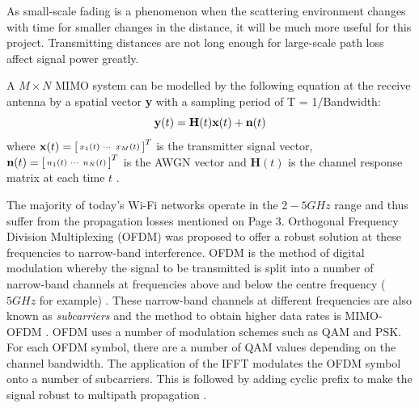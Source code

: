 As small-scale fading is a phenomenon when the scattering environment changes with time for smaller changes in the distance, it will be much more useful for this project. Transmitting distances are not long enough for large-scale path loss affect signal power greatly. \par
A $M\times N$ MIMO system can be modelled by the following equation at the receive antenna by a spatial vector \textbf{y} with a sampling period of T = 1/Bandwidth:
\vspace{-11pt}
\begin{equation}\label{eqn:2.1}
    \textbf{y}(t) = \textbf{H}(t)\textbf{x}(t)+\textbf{n}(t)
    \vspace{-11pt}
\end{equation}
where  $\textbf{x}(t) = \begin{bsmallmatrix}x_1(t) & \cdots & x_M(t)\end{bsmallmatrix}^T$ is the transmitter signal vector, $\textbf{n}(t) = \begin{bsmallmatrix}n_1(t) & \cdots & n_N(t)\end{bsmallmatrix}^T$ is the AWGN vector and $\textbf{H}(t)$ is the channel response matrix at each time $t$ \citep{channelEquations}. \par
The majority of today's Wi-Fi networks operate in the $2-5GHz$ range and thus suffer from the propagation losses mentioned on Page 3. Orthogonal Frequency Division Multiplexing (OFDM) was proposed to offer a robust solution at these frequencies to narrow-band interference. OFDM is the method of digital modulation whereby the signal to be transmitted is split into a number of narrow-band channels at frequencies above and below the centre frequency ($5GHz$ for example) \citep{OFDM}. 
These narrow-band channels at different frequencies are also known as \textit{subcarriers} and the method to obtain higher data rates is MIMO-OFDM \citep{802.11nStandard}. OFDM uses a number of modulation schemes such as QAM and PSK. For each OFDM symbol, there are a number of QAM values depending on the channel bandwidth. The application of the IFFT modulates the OFDM symbol onto a number of subcarriers. This is followed by adding cyclic prefix to make the signal robust to multipath propagation \citep{OFDM, 802.11nStandard}. \par
